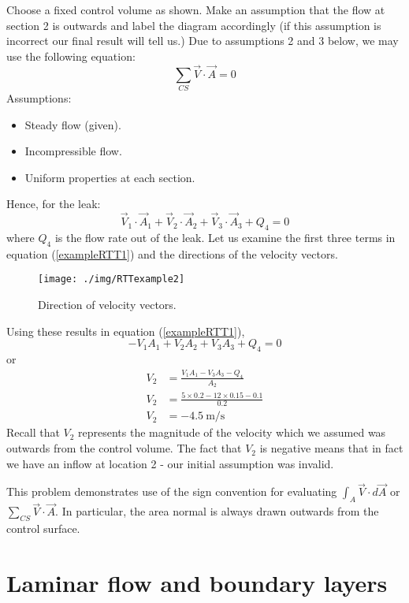 Choose a fixed control volume as shown. Make an assumption that the flow at section 2 is outwards and label the diagram accordingly (if this assumption is incorrect our final result will tell us.) Due to assumptions 2 and 3 below, we may use the following equation:
\begin{equation}
  \sum_{CS} \vec{V} \cdot \vec{A} = 0
\end{equation}
Assumptions:
\begin{itemize}[noitemsep]
  \item Steady flow (given).
  \item Incompressible flow.
  \item Uniform properties at each section.
\end{itemize}
Hence, for the leak:
\begin{equation}
  \vec{V}_1 \cdot \vec{A}_1 + \vec{V}_2 \cdot \vec{A}_2 + \vec{V}_3 \cdot \vec{A}_3 + Q_4 = 0
  \label{exampleRTT1}
\end{equation}
where $Q_4$ is the flow rate out of the leak. Let us examine the first three terms in equation (\ref{exampleRTT1}) and the directions of the velocity vectors.
\begin{figure}
  \centering
  \texttt{[image: ./img/RTTexample2]}
  \caption{Direction of velocity vectors. }
\end{figure}
Using these results in equation (\ref{exampleRTT1}),
\begin{equation}
  -V_1 A_1 + V_2 A_2 + V_3 A_3 + Q_4 = 0
\end{equation}
or
\begin{align}
  V_2 & = \frac{V_1 A_1 - V_3 A_3 - Q_4}{A_2}           \\
  V_2 & = \frac{5\times 0.2 - 12\times 0.15 - 0.1}{0.2} \\
  V_2 & = -4.5 \ \si{\meter\per\second}
\end{align}
Recall that $V_2$ represents the magnitude of the velocity which we assumed was outwards from the control volume. The fact that $V_2$ is negative means that in fact we have an inflow at location 2 - our initial assumption was invalid.

This problem demonstrates use of the sign convention for evaluating $\int_A \vec{V} \cdot d\vec{A}$ or $\sum_{CS} \vec{V} \cdot \vec{A}$. In particular, the area normal is always drawn outwards from the control surface.
\section{Laminar flow and boundary layers}
